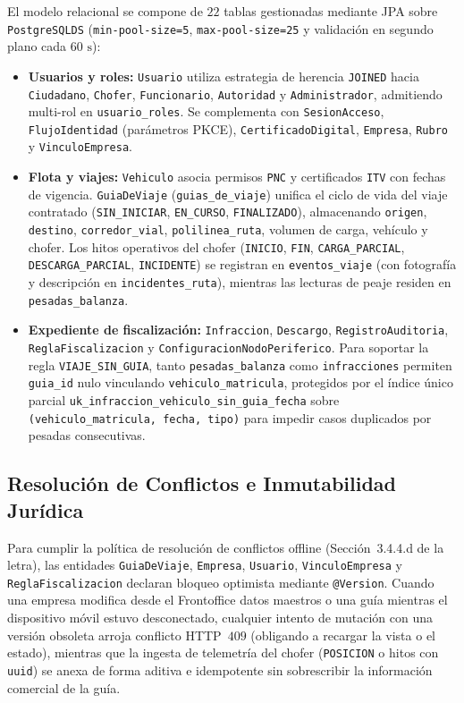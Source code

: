 \documentclass[11pt,a4paper,twocolumn]{article}
\begin{document}
El modelo relacional se compone de $22$ tablas gestionadas mediante JPA sobre \texttt{PostgreSQLDS} (\texttt{min-pool-size=5}, \texttt{max-pool-size=25} y validación en segundo plano cada $60\text{ s}$):
\begin{itemize}
    \item \textbf{Usuarios y roles:} \texttt{Usuario} utiliza estrategia de herencia \texttt{JOINED} hacia \texttt{Ciudadano}, \texttt{Chofer}, \texttt{Funcionario}, \texttt{Autoridad} y \texttt{Administrador}, admitiendo multi-rol en \texttt{usuario\_roles}. Se complementa con \texttt{SesionAcceso}, \texttt{FlujoIdentidad} (parámetros PKCE), \texttt{CertificadoDigital}, \texttt{Empresa}, \texttt{Rubro} y \texttt{VinculoEmpresa}.
    \item \textbf{Flota y viajes:} \texttt{Vehiculo} asocia permisos \texttt{PNC} y certificados \texttt{ITV} con fechas de vigencia. \texttt{GuiaDeViaje} (\texttt{guias\_de\_viaje}) unifica el ciclo de vida del viaje contratado (\texttt{SIN\_INICIAR}, \texttt{EN\_CURSO}, \texttt{FINALIZADO}), almacenando \texttt{origen}, \texttt{destino}, \texttt{corredor\_vial}, \texttt{polilinea\_ruta}, volumen de carga, vehículo y chofer. Los hitos operativos del chofer (\texttt{INICIO}, \texttt{FIN}, \texttt{CARGA\_PARCIAL}, \texttt{DESCARGA\_PARCIAL}, \texttt{INCIDENTE}) se registran en \texttt{eventos\_viaje} (con fotografía y descripción en \texttt{incidentes\_ruta}), mientras las lecturas de peaje residen en \texttt{pesadas\_balanza}.
    \item \textbf{Expediente de fiscalización:} \texttt{Infraccion}, \texttt{Descargo}, \texttt{RegistroAuditoria}, \texttt{ReglaFiscalizacion} y \texttt{ConfiguracionNodoPeriferico}. Para soportar la regla \texttt{VIAJE\_SIN\_GUIA}, tanto \texttt{pesadas\_balanza} como \texttt{infracciones} permiten \texttt{guia\_id} nulo vinculando \texttt{vehiculo\_matricula}, protegidos por el índice único parcial \texttt{uk\_infraccion\_vehiculo\_sin\_guia\_fecha} sobre \texttt{(vehiculo\_matricula, fecha, tipo)} para impedir casos duplicados por pesadas consecutivas.
\end{itemize}

\subsection{Resolución de Conflictos e Inmutabilidad Jurídica}

Para cumplir la política de resolución de conflictos offline (Sección~3.4.4.d de la letra), las entidades \texttt{GuiaDeViaje}, \texttt{Empresa}, \texttt{Usuario}, \texttt{VinculoEmpresa} y \texttt{ReglaFiscalizacion} declaran bloqueo optimista mediante \texttt{@Version}. Cuando una empresa modifica desde el Frontoffice datos maestros o una guía mientras el dispositivo móvil estuvo desconectado, cualquier intento de mutación con una versión obsoleta arroja conflicto HTTP~$409$ (obligando a recargar la vista o el estado), mientras que la ingesta de telemetría del chofer (\texttt{POSICION} o hitos con \texttt{uuid}) se anexa de forma aditiva e idempotente sin sobrescribir la información comercial de la guía.
\end{document}
